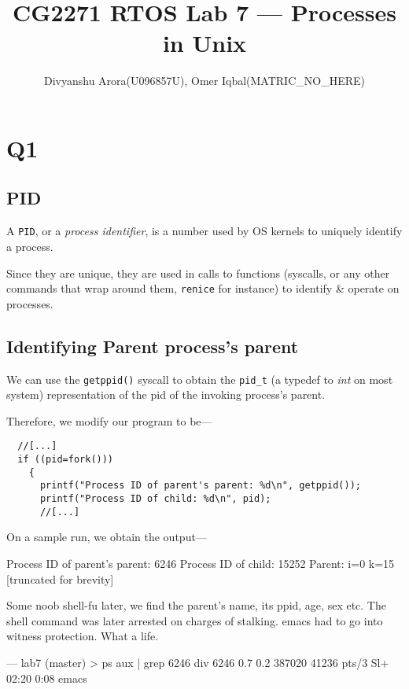 \documentclass[runningheads,a4paper]{report}
\title{CG2271 RTOS Lab 7 --- Processes in Unix}
\author{Divyanshu Arora(U096857U), Omer Iqbal(MATRIC\_NO\_HERE)}
\begin{document}
\maketitle
{}
\section*{Q1}

\subsection*{PID}

A \texttt{PID}, or a \textit{process identifier}, is a number used by
OS kernels to uniquely identify a process.

Since they are unique, they are used in calls to functions (syscalls,
or any other commands that wrap around them, \texttt{renice} for
instance) to identify \& operate on processes.

\subsection*{Identifying Parent process's parent}

We can use the \texttt{getppid()} syscall to obtain the
\texttt{pid\_t} (a typedef to \textit{int} on most system)
representation of the pid of the
invoking process's parent.

Therefore, we modify our program to be---
\lstset{caption=Adding a getppid() call, language=inform}
\begin{lstlisting}
  //[...]
  if ((pid=fork()))
    {
      printf("Process ID of parent's parent: %d\n", getppid());
      printf("Process ID of child: %d\n", pid);
      //[...]
\end{lstlisting}


On a sample run, we obtain the output---
\begin{codeoutput}
Process ID of parent's parent: 6246
Process ID of child: 15252
Parent: i=0 k=15
[truncated for brevity]
\end{codeoutput}

Some noob shell-fu later, we find the parent's name, its ppid, age, sex etc. The shell command was later arrested on charges of stalking. emacs had to go into witness protection. What a life.
\lstset{caption=Exhibit `A'}
\begin{code}
--- lab7 (master) > ps aux | grep 6246
div    6246  0.7  0.2 387020 41236 pts/3    Sl+  02:20   0:08 emacs
\end{code}
\end{document}
